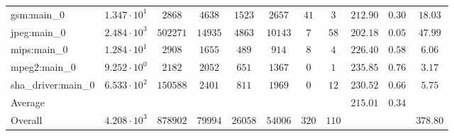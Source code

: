 \begin{tabular}{|l|c|c|c|c|c|c|c|c|c|c|}
gsm:main\_0             & $ 1.347 \cdot 10^{1}  $ & $ 2868   $ & $ 4638  $ & $ 1523  $ & $ 2657  $ & $ 41  $ & $ 3   $ & $ 212.90      $ & $ 0.30    $ & $ 18.03   $ \\
jpeg:main\_0            & $ 2.484 \cdot 10^{3}  $ & $ 502271 $ & $ 14935 $ & $ 4863  $ & $ 10143 $ & $ 7   $ & $ 58  $ & $ 202.18      $ & $ 0.05    $ & $ 47.99   $ \\
mips:main\_0            & $ 1.284 \cdot 10^{1}  $ & $ 2908   $ & $ 1655  $ & $ 489   $ & $ 914   $ & $ 8   $ & $ 4   $ & $ 226.40      $ & $ 0.58    $ & $ 6.06    $ \\
mpeg2:main\_0           & $ 9.252 \cdot 10^{0}  $ & $ 2182   $ & $ 2052  $ & $ 651   $ & $ 1367  $ & $ 0   $ & $ 1   $ & $ 235.85      $ & $ 0.76    $ & $ 3.17    $ \\
sha\_driver:main\_0     & $ 6.533 \cdot 10^{2}  $ & $ 150588 $ & $ 2401  $ & $ 811   $ & $ 1969  $ & $ 0   $ & $ 12  $ & $ 230.52      $ & $ 0.66    $ & $ 5.75    $ \\
\hline
Average                 & $                     $ & $        $ & $       $ & $       $ & $       $ & $     $ & $     $ & $ 215.01      $ & $ 0.34    $ & $         $ \\
\hline
Overall                 & $ 4.208 \cdot 10^{3}  $ & $ 878902 $ & $ 79994 $ & $ 26058 $ & $ 54006 $ & $ 320 $ & $ 110 $ & $             $ & $         $ & $ 378.80  $ \\
\hline
\end{tabular}
